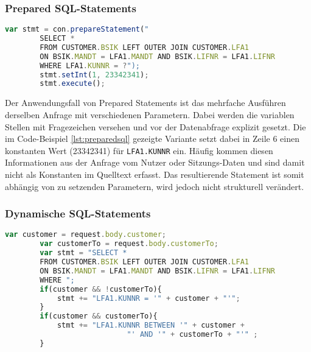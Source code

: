 \subsubsection{Prepared SQL-Statements}

	\begin{lstlisting}[caption={Prepared Statements eingebettet im Quelltext}, label={lst:preparedsql}, language=JavaScript]
		var stmt = con.prepareStatement("
		SELECT *
		FROM CUSTOMER.BSIK LEFT OUTER JOIN CUSTOMER.LFA1
		ON BSIK.MANDT = LFA1.MANDT AND BSIK.LIFNR = LFA1.LIFNR
		WHERE LFA1.KUNNR = ?");
		stmt.setInt(1, 23342341);
		stmt.execute();
	\end{lstlisting}

Der Anwendungsfall von Prepared Statements ist das mehrfache Ausführen derselben Anfrage mit verschiedenen Parametern.
Dabei werden die variablen Stellen mit Fragezeichen versehen und vor der Datenabfrage explizit gesetzt.
Die im Code-Beispiel \ref{lst:preparedsql} gezeigte Variante setzt dabei in Zeile 6 einen konstanten Wert (23342341) für \texttt{LFA1.KUNNR} ein.
Häufig kommen diesen Informationen aus der Anfrage vom Nutzer oder Sitzungs-Daten und sind damit nicht als Konstanten im Quelltext erfasst.
Das resultierende Statement ist somit abhängig von zu setzenden Parametern, wird jedoch nicht strukturell verändert.

\subsubsection{Dynamische SQL-Statements}

	\begin{lstlisting}[caption={Dynamische SQL-Statements können verschiedene Ausprägungen annehmen.}, label={lst:dynamicsql}, language=JavaScript]
		var customer = request.body.customer;
		var customerTo = request.body.customerTo;
		var stmt = "SELECT *
		FROM CUSTOMER.BSIK LEFT OUTER JOIN CUSTOMER.LFA1
		ON BSIK.MANDT = LFA1.MANDT AND BSIK.LIFNR = LFA1.LIFNR
		WHERE ";
		if(customer && !customerTo){
			stmt += "LFA1.KUNNR = '" + customer + "'";
		}
		if(customer && customerTo){
			stmt += "LFA1.KUNNR BETWEEN '" + customer +
							"' AND '" + customerTo + "'" ;
		}
	\end{lstlisting}


